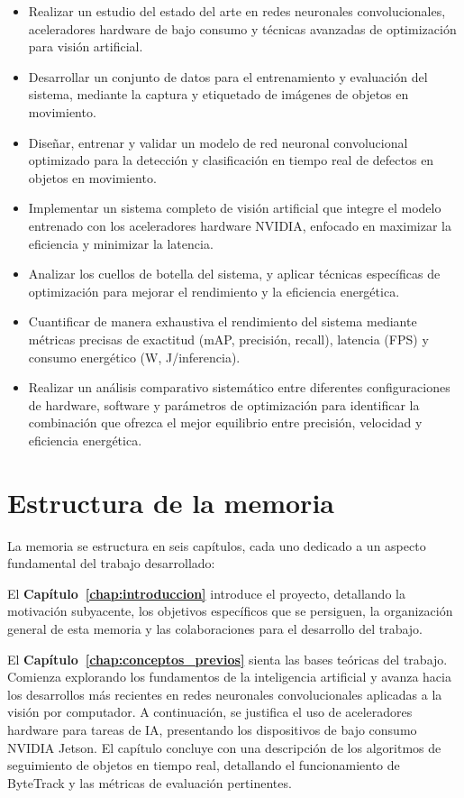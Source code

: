 \documentclass[11pt,spanish,listoffigures,listoftables]{tfgetsinf}
\begin{document}
\begin{itemize}
   \item Realizar un estudio del estado del arte en redes neuronales convolucionales, aceleradores hardware de bajo consumo y técnicas avanzadas de optimización para visión artificial.
   \item Desarrollar un conjunto de datos para el entrenamiento y evaluación del sistema, mediante la captura y etiquetado de imágenes de objetos en movimiento.
   \item Diseñar, entrenar y validar un modelo de red neuronal convolucional optimizado para la detección y clasificación en tiempo real de defectos en objetos en movimiento.
   \item Implementar un sistema completo de visión artificial que integre el modelo entrenado con los aceleradores hardware NVIDIA, enfocado en maximizar la eficiencia y minimizar la latencia.
   \item Analizar los cuellos de botella del sistema, y aplicar técnicas específicas de optimización para mejorar el rendimiento y la eficiencia energética.
   \item Cuantificar de manera exhaustiva el rendimiento del sistema mediante métricas precisas de exactitud (mAP, precisión, recall), latencia (FPS) y consumo energético (W, J/inferencia).
   \item Realizar un análisis comparativo sistemático entre diferentes configuraciones de hardware, software y parámetros de optimización para identificar la combinación que ofrezca el mejor equilibrio entre precisión, velocidad y eficiencia energética.
\end{itemize}

\section{Estructura de la memoria}\label{sec:estructura_memoria}

La memoria se estructura en seis capítulos, cada uno dedicado a un aspecto fundamental del trabajo desarrollado:

El \textbf{Capítulo~\ref{chap:introduccion}} introduce el proyecto, detallando la motivación subyacente, los objetivos específicos que se persiguen, la organización general de esta memoria y las colaboraciones para el desarrollo del trabajo.

El \textbf{Capítulo~\ref{chap:conceptos_previos}} sienta las bases teóricas del trabajo. Comienza explorando los fundamentos de la inteligencia artificial y avanza hacia los desarrollos más recientes en redes neuronales convolucionales aplicadas a la visión por computador. A continuación, se justifica el uso de aceleradores hardware para tareas de IA, presentando los dispositivos de bajo consumo NVIDIA Jetson. El capítulo concluye con una descripción de los algoritmos de seguimiento de objetos en tiempo real, detallando el funcionamiento de ByteTrack y las métricas de evaluación pertinentes.
\end{document}
